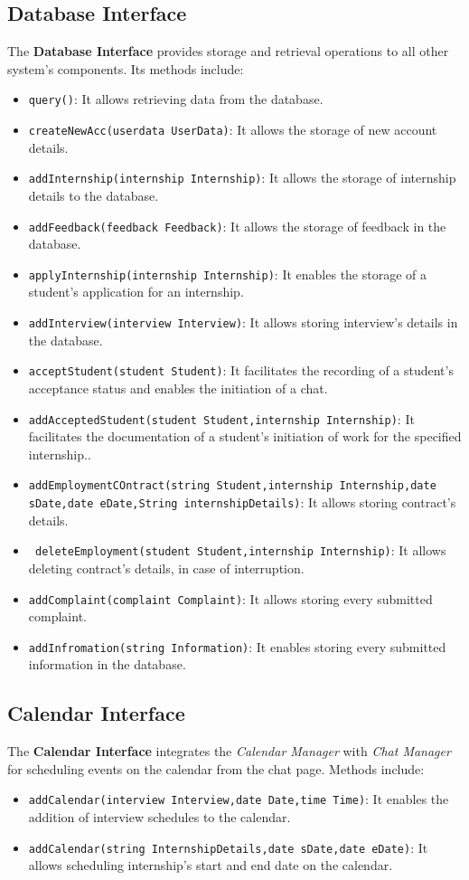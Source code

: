 \subsection{Database Interface}
The \textbf{Database Interface} provides storage and retrieval operations to all other system's components. Its methods include:
\begin{itemize}
    \item \texttt{query()}: It allows retrieving data from the database.
    \item \texttt{createNewAcc(userdata UserData)}: It allows the storage of new account details.
    \item \texttt{addInternship(internship Internship)}: It allows the storage of internship details to the database.
    \item \texttt{addFeedback(feedback Feedback)}: It allows the storage of feedback in the database.
    \item \texttt{applyInternship(internship Internship)}: It enables the storage of a student's application for an internship.
    \item \texttt{addInterview(interview Interview)}: It allows storing interview's details in the database.
    \item \texttt{acceptStudent(student Student)}: It facilitates the recording of a student's acceptance status and enables the initiation of a chat.
    \item \texttt{addAcceptedStudent(student Student,internship Internship)}: It facilitates the documentation of a student's initiation of work for the specified internship..
    \item \texttt{addEmploymentCOntract(string Student,internship Internship,date sDate,date eDate,String internshipDetails)}: It allows storing contract's details.
    \item \texttt{ deleteEmployment(student Student,internship Internship)}: It allows deleting contract's details, in case of interruption.
    \item \texttt{addComplaint(complaint Complaint)}: It allows storing every submitted complaint.
    \item \texttt{addInfromation(string Information)}: It enables storing every submitted information in the database.
\end{itemize}

\subsection{Calendar Interface}
The \textbf{Calendar Interface} integrates the \textit{Calendar Manager} with \textit{Chat Manager} for scheduling events on the calendar from the chat page. Methods include:
\begin{itemize}
    \item \texttt{addCalendar(interview Interview,date Date,time Time)}: It enables the addition of interview schedules to the calendar.
    \item \texttt{addCalendar(string InternshipDetails,date sDate,date eDate)}: It allows scheduling internship's start and end date on the calendar.
\end{itemize}

